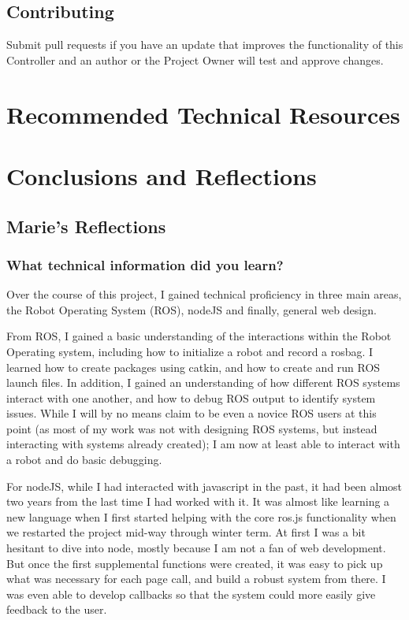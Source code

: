 \documentclass[onecolumn, draftclsnofoot,10pt, compsoc]{report}
\begin{document}
\section{Contributing}

Submit pull requests if you have an update that improves the functionality of this Controller and an author or the Project Owner will test and approve changes.

\chapter{Recommended Technical Resources}
\minitoc

\chapter{Conclusions and Reflections}
\minitoc
\section{Marie's Reflections}
\subsection{What technical information did you learn?}
Over the course of this project, I gained technical proficiency in three main areas, the Robot Operating System (ROS), nodeJS and finally, general web design. 

From ROS, I gained a basic understanding of the interactions within the Robot Operating system, including how to initialize a robot and record a rosbag. I learned how to create packages using catkin, and how to create and run ROS launch files. In addition, I gained an understanding of how different ROS systems interact with one another, and how to debug ROS output to identify system issues. While I will by no means claim to be even a novice ROS users at this point (as most of my work was not with designing ROS systems, but instead interacting with systems already created); I am now at least able to interact with a robot and do basic debugging. 

For nodeJS, while I had interacted with javascript in the past, it had been almost two years from the last time I had worked with it. It was almost like learning a new language when I first started helping with the core ros.js functionality when we restarted the project mid-way through winter term. At first I was a bit hesitant to dive into node, mostly because I am not a fan of web development. But once the first supplemental functions were created, it was easy to pick up what was necessary for each page call, and build a robust system from there. I was even able to develop callbacks so that the system could more easily give feedback to the user. 
\end{document}
